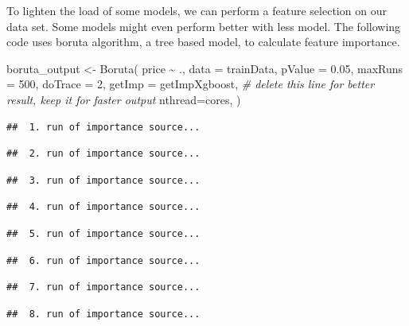 \documentclass[
]{article}
\newenvironment{Shaded}{\begin{snugshade}}{\end{snugshade}}
\newcommand{\AttributeTok}[1]{\textcolor[rgb]{0.77,0.63,0.00}{#1}}
\newcommand{\CommentTok}[1]{\textcolor[rgb]{0.56,0.35,0.01}{\textit{#1}}}
\newcommand{\DecValTok}[1]{\textcolor[rgb]{0.00,0.00,0.81}{#1}}
\newcommand{\FloatTok}[1]{\textcolor[rgb]{0.00,0.00,0.81}{#1}}
\newcommand{\FunctionTok}[1]{\textcolor[rgb]{0.00,0.00,0.00}{#1}}
\newcommand{\NormalTok}[1]{#1}
\newcommand{\OtherTok}[1]{\textcolor[rgb]{0.56,0.35,0.01}{#1}}
\newcommand{\SpecialCharTok}[1]{\textcolor[rgb]{0.00,0.00,0.00}{#1}}
\begin{document}
To lighten the load of some models, we can perform a feature selection
on our data set. Some models might even perform better with less model.
The following code uses boruta algorithm, a tree based model, to
calculate feature importance.

\begin{Shaded}
\begin{Highlighting}[]
\NormalTok{boruta\_output }\OtherTok{\textless{}{-}}
  \FunctionTok{Boruta}\NormalTok{(}
\NormalTok{    price }\SpecialCharTok{\textasciitilde{}}\NormalTok{ .,}
    \AttributeTok{data =}\NormalTok{ trainData,}
    \AttributeTok{pValue =} \FloatTok{0.05}\NormalTok{,}
    \AttributeTok{maxRuns =} \DecValTok{500}\NormalTok{,}
    \AttributeTok{doTrace =} \DecValTok{2}\NormalTok{,}
    \AttributeTok{getImp =}\NormalTok{ getImpXgboost, }\CommentTok{\# delete this line for better result, keep it for faster output}
    \AttributeTok{nthread=}\NormalTok{cores,}
\NormalTok{  )}
\end{Highlighting}
\end{Shaded}

\begin{verbatim}
##  1. run of importance source...
\end{verbatim}

\begin{verbatim}
##  2. run of importance source...
\end{verbatim}

\begin{verbatim}
##  3. run of importance source...
\end{verbatim}

\begin{verbatim}
##  4. run of importance source...
\end{verbatim}

\begin{verbatim}
##  5. run of importance source...
\end{verbatim}

\begin{verbatim}
##  6. run of importance source...
\end{verbatim}

\begin{verbatim}
##  7. run of importance source...
\end{verbatim}

\begin{verbatim}
##  8. run of importance source...
\end{verbatim}
\end{document}
